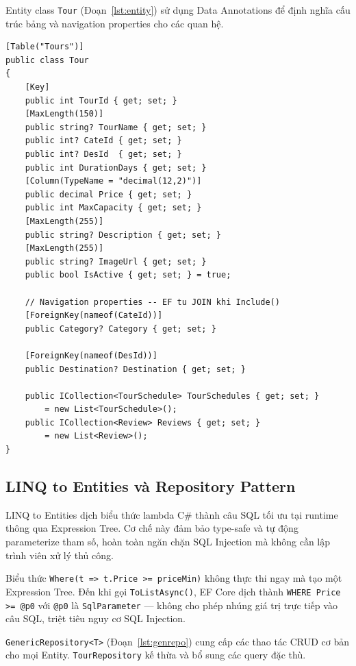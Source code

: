 Entity class \texttt{Tour} (Đoạn~\ref{lst:entity}) sử dụng
Data Annotations để định nghĩa cấu trúc bảng và navigation
properties cho các quan hệ.

\begin{lstlisting}[style=csharp,
  caption={Entity Tour với Data Annotations và navigation properties},
  label={lst:entity}]
[Table("Tours")]
public class Tour
{
    [Key]
    public int TourId { get; set; }
    [MaxLength(150)]
    public string? TourName { get; set; }
    public int? CateId { get; set; }
    public int? DesId  { get; set; }
    public int DurationDays { get; set; }
    [Column(TypeName = "decimal(12,2)")]
    public decimal Price { get; set; }
    public int MaxCapacity { get; set; }
    [MaxLength(255)]
    public string? Description { get; set; }
    [MaxLength(255)]
    public string? ImageUrl { get; set; }
    public bool IsActive { get; set; } = true;

    // Navigation properties -- EF tu JOIN khi Include()
    [ForeignKey(nameof(CateId))]
    public Category? Category { get; set; }

    [ForeignKey(nameof(DesId))]
    public Destination? Destination { get; set; }

    public ICollection<TourSchedule> TourSchedules { get; set; }
        = new List<TourSchedule>();
    public ICollection<Review> Reviews { get; set; }
        = new List<Review>();
}
\end{lstlisting}

\subsection{LINQ to Entities và Repository Pattern}
  \label{sub3.4.2}

LINQ to Entities dịch biểu thức lambda C\# thành câu SQL tối
ưu tại runtime thông qua Expression Tree. Cơ chế này đảm bảo
type-safe và tự động parameterize tham số, hoàn toàn ngăn chặn
SQL Injection mà không cần lập trình viên xử lý thủ công.

Biểu thức \texttt{Where(t => t.Price >= priceMin)} không thực
thi ngay mà tạo một Expression Tree. Đến khi gọi
\texttt{ToListAsync()}, EF Core dịch thành
\texttt{WHERE Price >= @p0} với \texttt{@p0} là
\texttt{SqlParameter} — không cho phép nhúng giá trị trực tiếp
vào câu SQL, triệt tiêu nguy cơ SQL Injection. \QEDAa

\texttt{GenericRepository<T>} (Đoạn~\ref{lst:genrepo}) cung
cấp các thao tác CRUD cơ bản cho mọi Entity.
\texttt{TourRepository} kế thừa và bổ sung các query đặc thù.

